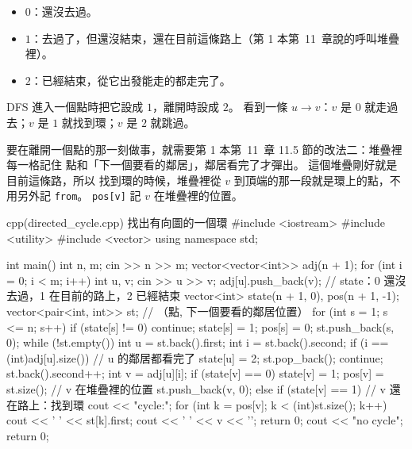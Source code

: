 \begin{itemize}
\item $0$：還沒去過。
\item $1$：去過了，但還沒結束，還在目前這條路上（第 1 本第~11~章說的呼叫堆疊裡）。
\item $2$：已經結束，從它出發能走的都走完了。
\end{itemize}

DFS 進入一個點時把它設成 $1$，離開時設成 $2$。 看到一條 $u \to v$：$v$ 是 $0$
就走過去；$v$ 是 $1$ 就找到環；$v$ 是 $2$ 就跳過。

要在離開一個點的那一刻做事，就需要第 1 本第~11~章 11.5 節的改法二：堆疊裡每一格記住
點和「下一個要看的鄰居」，鄰居看完了才彈出。 這個堆疊剛好就是目前這條路，所以
找到環的時候，堆疊裡從 $v$ 到頂端的那一段就是環上的點，不用另外記
\texttt{from}。 \texttt{pos[v]} 記 $v$ 在堆疊裡的位置。

\begin{example}[label=ex:directed-cycle]{cpp}{(directed\_cycle.cpp) 找出有向圖的一個環}
#include <iostream>
#include <utility>
#include <vector>
using namespace std;

int main() {
    int n, m;
    cin >> n >> m;
    vector<vector<int>> adj(n + 1);
    for (int i = 0; i < m; i++) {
        int u, v;
        cin >> u >> v;
        adj[u].push_back(v);
    }
    // state：0 還沒去過，1 在目前的路上，2 已經結束
    vector<int> state(n + 1, 0), pos(n + 1, -1);
    vector<pair<int, int>> st;             // （點, 下一個要看的鄰居位置）
    for (int s = 1; s <= n; s++) {
        if (state[s] != 0) {
            continue;
        }
        state[s] = 1;
        pos[s] = 0;
        st.push_back({s, 0});
        while (!st.empty()) {
            int u = st.back().first;
            int i = st.back().second;
            if (i == (int)adj[u].size()) {     // u 的鄰居都看完了
                state[u] = 2;
                st.pop_back();
                continue;
            }
            st.back().second++;
            int v = adj[u][i];
            if (state[v] == 0) {
                state[v] = 1;
                pos[v] = st.size();            // v 在堆疊裡的位置
                st.push_back({v, 0});
            } else if (state[v] == 1) {        // v 還在路上：找到環
                cout << "cycle:";
                for (int k = pos[v]; k < (int)st.size(); k++) {
                    cout << ' ' << st[k].first;
                }
                cout << ' ' << v << '\n';
                return 0;
            }
        }
    }
    cout << "no cycle\n";
    return 0;
}
\end{example}

